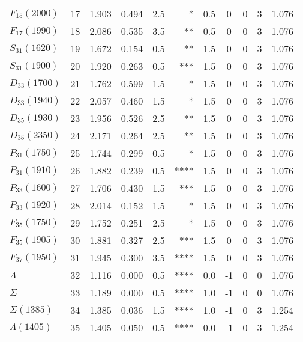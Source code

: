 \documentclass[a4paper,10pt]{article}
\begin{document}
\begin{tabular}{lrcccrccccc}
$F_{15}(2000)  $ &  17&  1.903&  0.494 &  2.5 &     *&      0.5&       0&       0&       3& 1.076\\
$F_{17}(1990)  $ &  18&  2.086&  0.535 &  3.5 &    **&      0.5&       0&       0&       3& 1.076\\
$S_{31}(1620)  $ &  19&  1.672&  0.154 &  0.5 &    **&      1.5&       0&       0&       3& 1.076\\
$S_{31}(1900)  $ &  20&  1.920&  0.263 &  0.5 &   ***&      1.5&       0&       0&       3& 1.076\\
$D_{33}(1700)  $ &  21&  1.762&  0.599 &  1.5 &     *&      1.5&       0&       0&       3& 1.076\\
$D_{33}(1940)  $ &  22&  2.057&  0.460 &  1.5 &     *&      1.5&       0&       0&       3& 1.076\\
$D_{35}(1930)  $ &  23&  1.956&  0.526 &  2.5 &    **&      1.5&       0&       0&       3& 1.076\\
$D_{35}(2350)  $ &  24&  2.171&  0.264 &  2.5 &    **&      1.5&       0&       0&       3& 1.076\\
$P_{31}(1750)  $ &  25&  1.744&  0.299 &  0.5 &     *&      1.5&       0&       0&       3& 1.076\\
$P_{31}(1910)  $ &  26&  1.882&  0.239 &  0.5 &  ****&      1.5&       0&       0&       3& 1.076\\
$P_{33}(1600)  $ &  27&  1.706&  0.430 &  1.5 &   ***&      1.5&       0&       0&       3& 1.076\\
$P_{33}(1920)  $ &  28&  2.014&  0.152 &  1.5 &     *&      1.5&       0&       0&       3& 1.076\\
$F_{35}(1750)  $ &  29&  1.752&  0.251 &  2.5 &     *&      1.5&       0&       0&       3& 1.076\\
$F_{35}(1905)  $ &  30&  1.881&  0.327 &  2.5 &   ***&      1.5&       0&       0&       3& 1.076\\
$F_{37}(1950)  $ &  31&  1.945&  0.300 &  3.5 &  ****&      1.5&       0&       0&       3& 1.076\\
\midrule
$\Lambda       $ &  32&  1.116&  0.000 &  0.5 &  ****&      0.0&      -1&       0&       0& 1.076\\
$\Sigma        $ &  33&  1.189&  0.000 &  0.5 &  ****&      1.0&      -1&       0&       0& 1.076\\
$\Sigma(1385)  $ &  34&  1.385&  0.036 &  1.5 &  ****&      1.0&      -1&       0&       3& 1.254\\
$\Lambda(1405) $ &  35&  1.405&  0.050 &  0.5 &  ****&      0.0&      -1&       0&       3& 1.254\\

\end{tabular}
\end{document}
